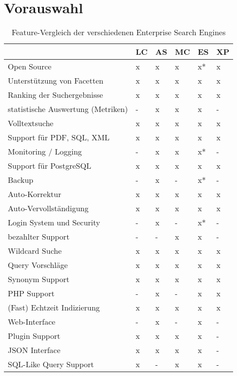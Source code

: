 \cite{XAP.2019}

\section {Vorauswahl}

\begin{table} %
	\centering
		\begin{tabular}{l | l | l | l | l | l}
		& \textbf{LC} & \textbf{AS} & \textbf{MC} & \textbf{ES}  & \textbf{XP} \\
        \hline
        Open Source                                 & x & x & x & x* & x \\
        Unterstützung von Facetten                  & x & x & x & x  & x \\
        Ranking der Suchergebnisse                  & x & x & x & x  & x \\
        statistische Auswertung (Metriken)          & - & x & x & x  & - \\
        Volltextsuche                               & x & x & x & x  & x \\
        Support für PDF, SQL, XML                   & x & x & x & x  & x \\
        Monitoring / Logging                        & - & x & x & x* & - \\
        Support für PostgreSQL                      & x & x & x & x  & x \\
        Backup                                      & - & x & - & x* & - \\
        Auto-Korrektur                              & x & x & x & x  & x \\
        Auto-Vervollständigung                      & x & x & x & x  & x \\
        Login System und Security                   & - & x & - & x* & - \\
        bezahlter Support                           & - & - & x & x  & - \\
        Wildcard Suche                              & x & x & x & x  & x \\
        Query Vorschläge                            & x & x & x & x  & x \\
        Synonym Support                             & x & x & x & x  & x \\
        PHP Support                                 & - & x & - & x  & x \\
        (Fast) Echtzeit Indizierung                 & x & x & x & x  & x \\
        Web-Interface                               & - & x & - & x  & - \\
        Plugin Support                              & x & x & x & x  & - \\
        JSON Interface                              & x & x & x & x  & - \\
        SQL-Like Query Support                      & x & - & x & x  & - \\
		\end{tabular}
	\caption{Feature-Vergleich der verschiedenen Enterprise Search Engines}
    \label{vglTable}


\end{table}
